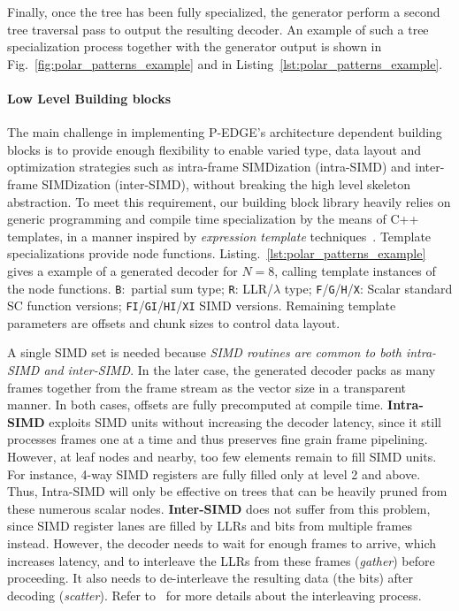 Finally, once the tree has been fully specialized, the generator perform a
second tree traversal pass to output the resulting decoder. An example of such a
tree specialization process together with the generator output is shown in
Fig.~\ref{fig:polar_patterns_example} and in
Listing~\ref{lst:polar_patterns_example}.

\paragraph{Low Level Building blocks}
\label{sec:polar_api}

The main challenge in implementing P-EDGE's architecture dependent building
blocks is to provide enough flexibility to enable varied type, data layout and
optimization strategies such as intra-frame SIMDization (intra-SIMD) and
inter-frame SIMDization (inter-SIMD), without breaking the high level skeleton
abstraction. To meet this requirement, our building block library heavily relies
on generic programming and compile time specialization by the means of C++
templates, in a manner inspired by \emph{expression template}
techniques~\cite{Stroustrup2013}. Template specializations provide node
functions. Listing.~\ref{lst:polar_patterns_example} gives a example of a
generated decoder for $N = 8$, calling template instances of the node functions.
\texttt{B}:~partial sum type; \texttt{R}: LLR/$\lambda$ type;
\texttt{F}/\texttt{G}/\texttt{H}/\texttt{X}: Scalar standard SC function
versions; \texttt{FI}/\texttt{GI}/\texttt{HI}/\texttt{XI} SIMD versions.
Remaining template parameters are offsets and chunk sizes to control data
layout.

A single SIMD set is needed because \emph{SIMD routines are common to both
intra-SIMD and inter-SIMD}. In the later case, the generated decoder packs as
many frames together from the frame stream as the vector size in a transparent
manner. In both cases, offsets are fully precomputed at compile time.
\textbf{Intra-SIMD} exploits SIMD units without increasing the decoder latency,
since it still processes frames one at a time and thus preserves fine grain
frame pipelining. However, at leaf nodes and nearby, too few elements remain to
fill SIMD units. For instance, 4-way SIMD registers are fully filled only at
level 2 and above. Thus, Intra-SIMD will only be effective on trees that can be
heavily pruned from these numerous scalar nodes. \textbf{Inter-SIMD} does not
suffer from this problem, since SIMD register lanes are filled by LLRs and bits
from multiple frames instead. However, the decoder needs to wait for enough
frames to arrive, which increases latency, and to interleave the LLRs from these
frames (\emph{gather}) before proceeding. It also needs to de-interleave the
resulting data (the bits) after decoding (\emph{scatter}). Refer
to~\cite{LeGal2015a} for more details about the interleaving process.


